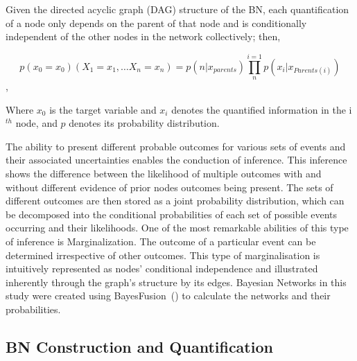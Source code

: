 \documentclass[10pt,letterpaper]{article}
\begin{document}
Given the directed acyclic graph (DAG) structure of the BN, each quantification of a node only depends on the parent of that node and is conditionally independent of the other nodes in the network collectively; then,

\begin{equation}
        p(x_{0}=x_{0}) (X_{1}=x_{1},\ldots X_{n}=x_{n})=p(n|x_{parents})\prod_{n}^{i=1}p(x_{i}|x_{Parents(i)})
\end{equation},

Where $x_0$ is the target variable and $x_i$ denotes the quantified information in the i$^{th}$ node, and $p$ denotes its probability distribution.

The ability to present different probable outcomes for various sets of events and their associated uncertainties enables the conduction of inference. This inference shows the difference between the likelihood of multiple outcomes with and without different evidence of prior nodes outcomes being present. The sets of different outcomes are then stored as a joint probability distribution, which can be decomposed into the conditional probabilities of each set of possible events occurring and their likelihoods. One of the most remarkable abilities of this type of inference is Marginalization. The outcome of a particular event can be determined irrespective of other outcomes. This type of marginalisation is intuitively represented as nodes' conditional independence and illustrated inherently through the graph's structure by its edges. Bayesian Networks in this study were created using BayesFusion~(\cite{bayesfusionGeNIeModelerUSER2022}) to calculate the networks and their probabilities. 

\subsection*{BN Construction and Quantification}
\end{document}
